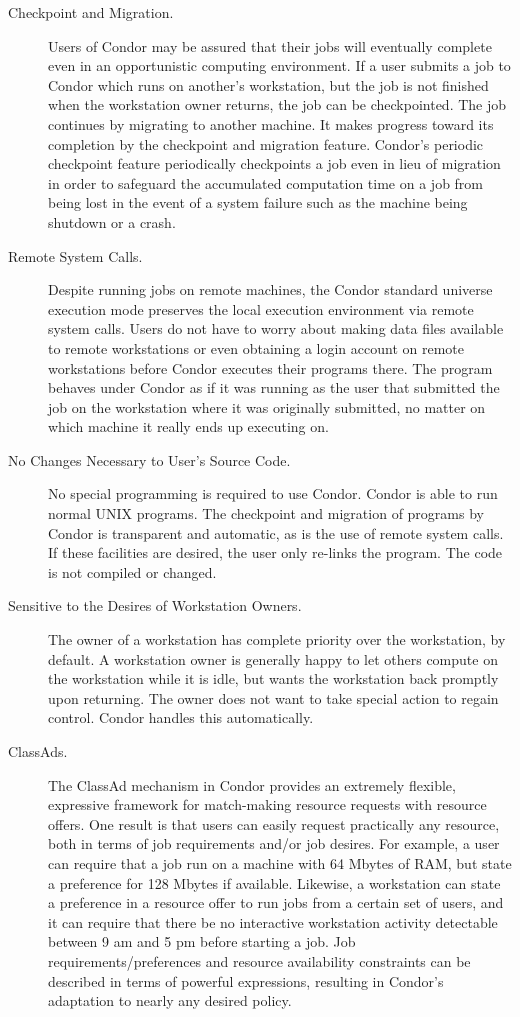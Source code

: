 \begin{description}
	\item[Checkpoint and Migration.] Users of Condor may be assured that
their jobs will eventually complete even in an opportunistic computing
environment. If a user submits a job to Condor which runs on another's
workstation, but the job is not finished when the workstation
owner returns, the job can be checkpointed.
The job continues
by migrating 
to another machine. It makes progress toward
its completion by the checkpoint and migration feature.
Condor's periodic checkpoint feature 
periodically checkpoints a job even in lieu of migration in order to
safeguard the accumulated computation time on a job from being lost in the
event of a system failure such as the machine being shutdown or a crash.
	\item[Remote System Calls.] 
Despite running jobs on remote machines,
the Condor standard universe execution
mode preserves the local execution environment
via remote system calls. Users do not have to worry
about making data files available to remote workstations or even
obtaining a login account on remote workstations before Condor executes
their programs there. The program behaves under Condor as if it was
running as the user that submitted the job on the workstation where it
was originally submitted, no matter on which machine it really ends up
executing on.
	\item[No Changes Necessary to User's Source Code.] No special programming
is required to use Condor. Condor is able to run normal UNIX programs.
The checkpoint and migration of programs by Condor is transparent and
automatic, as is the use of remote system calls.
If these facilities are desired, the user only re-links
the program.
The code is not compiled or changed.
	\item[Sensitive to the Desires of Workstation Owners.] The
owner of a
workstation has complete priority over the workstation,
by default.
A workstation owner is generally happy to let others compute on
the workstation while it is idle, but wants the workstation back
promptly upon returning. The owner does not want to take special
action to regain control. Condor handles this automatically. 
	\item[ClassAds.]The ClassAd mechanism 
in Condor provides an extremely
flexible, expressive framework for match-making
resource requests with resource offers. One result is that users can
easily request practically any resource, both in terms of job
requirements and/or job desires. For
example, a user can require that a job run on a machine with 64 Mbytes of
RAM, but state a preference for 128 Mbytes if available. Likewise, a
workstation
can state a preference in a resource offer to run jobs
from a certain set of users, and it can require that there be
no interactive workstation
activity detectable between 9 am and 5 pm before starting a job.  Job
requirements/preferences and resource availability constraints can be
described in terms of powerful expressions, resulting in
Condor's adaptation to nearly any desired policy. 
\end{description}

